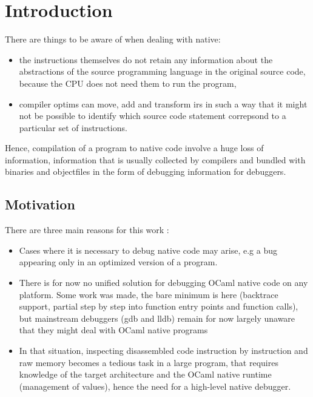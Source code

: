 \chapter{Introduction\label{cha:chapter1}}

There are things to be aware of when dealing with \gls{native}:
\begin{itemize}
    \item the instructions themselves do not retain any information about the abstractions of the source programming language in the original source code, because the CPU does not need them to run the program,

\item compiler \glspl{optim} can move, add and transform \glspl{ir} in such a way that it might not be possible to identify which source code statement correpsond to a particular set of instructions.
\end{itemize}

Hence, compilation of a program to native code involve a huge loss of information, information that is usually collected by compilers and bundled with binaries and \glspl{objectfile} in the form of debugging information for debuggers.

\section{Motivation\label{sec:moti}}

There are three main reasons for this work :

\begin{itemize}
    \item Cases where it is necessary to debug native code may arise, e.g a bug appearing only in an optimized version of a program.
    \item There is for now no unified solution for debugging OCaml native code on any platform. Some work was made, the bare minimum is here (\gls{backtrace} support, partial step by step into function entry points and function calls), but mainstream debuggers (gdb and lldb) remain for now largely unaware that they might deal with OCaml native programs
    \item In that situation, inspecting disassembled code instruction by instruction and raw memory becomes a tedious task in a large program, that requires knowledge of the target architecture and the OCaml native runtime (management of values), hence the need for a high-level native debugger.
\end{itemize}

